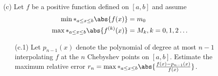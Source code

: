 \documentclass[11pt]{article}
\begin{document}
\begin{enumerate}
\begin{enumerate}
            \item[(c)] %
                Let $f$ be a positive function defined on $[a, b]$ and assume
                \begin{align*}
                    \min*_{a \le x \le b} \abs{f(x)} &= m_0 \\
                    \max*_{a \le x \le b} \abs{f^{(k)}(x)} &= M_k, k = 0, 1, 2 \ldots
                \end{align*}
                \begin{enumerate}
                    \item[(c.1)] %
                        Let $p_{n-1}(x)$ denote the polynomial of degree at most
                        $n - 1$ interpolating $f$ at the $n$ Chebyshev points on
                        $[a, b]$.
                        Estimate the maximum relative error
                        $r_n = \max*_{a \le x \le b} \abs{\frac{f(x) - p_{n-1}(x)}{f(x)}}$.


\end{enumerate}
\end{enumerate}
\end{enumerate}
\end{document}
